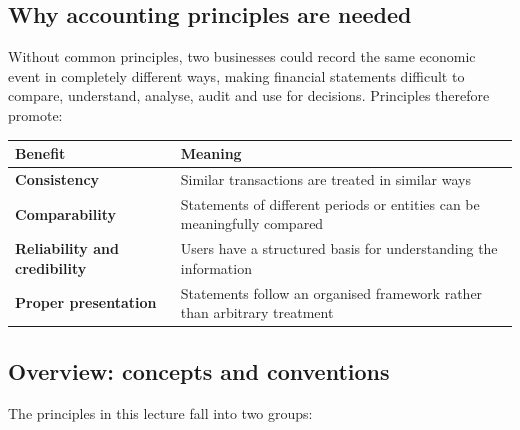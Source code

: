\documentclass[11pt,a4paper]{article}
\begin{document}
\subsection{Why accounting principles are needed}

Without common principles, two businesses could record the same economic event in completely different ways,
making financial statements difficult to compare, understand, analyse, audit and use for decisions. Principles
therefore promote:

\begin{center}
\small
\begin{tabularx}{\textwidth}{@{}l Y@{}}
\toprule
{}\textbf{Benefit} & \textbf{Meaning}\\
\midrule
\textbf{Consistency} & Similar transactions are treated in similar ways\\
\textbf{Comparability} & Statements of different periods or entities can be meaningfully compared\\
\textbf{Reliability and credibility} & Users have a structured basis for understanding the information\\
\textbf{Proper presentation} & Statements follow an organised framework rather than arbitrary treatment\\
\bottomrule
\end{tabularx}
\end{center}

\subsection{Overview: concepts and conventions}

The principles in this lecture fall into two groups:
\end{document}
